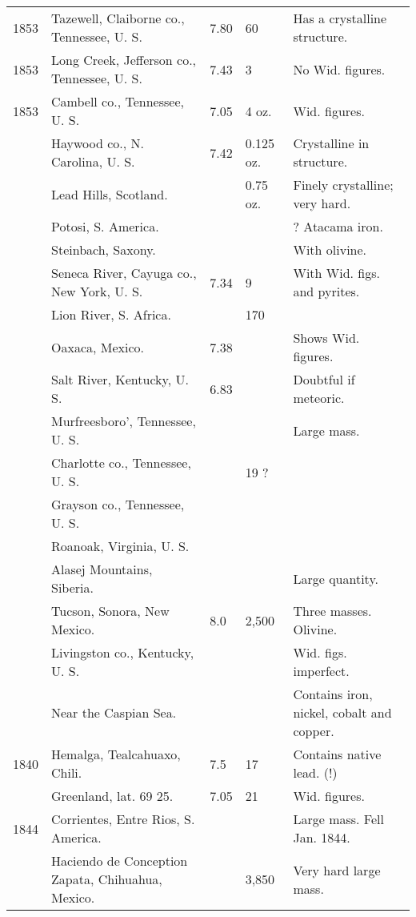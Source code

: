 \documentclass[a4paper, 12pt, oneside]{article}
\begin{document}
\begin{center}
\begin{longtable}{|p{16mm}|p{34mm}|p{10mm}|p{12mm}|p{40mm}|}
        1853 & Tazewell, Claiborne co., Tennessee, U. S. & 7.80 & 60 & Has a crystalline structure. \\
        1853 & Long Creek, Jefferson co., Tennessee, U. S. & 7.43 & 3 & No Wid. figures. \\
        1853 & Cambell co., Tennessee, U. S. & 7.05 & 4 oz. & Wid. figures. \\
        ~ & Haywood co., N. Carolina, U. S. & 7.42 & 0.125 oz. & Crystalline in structure. \\
        ~ & Lead Hills, Scotland. & ~ & 0.75 oz. & Finely crystalline; very hard. \\
        ~ & Potosi, S. America. & ~ & ~ & ? Atacama iron. \\
        ~ & Steinbach, Saxony. & ~ & ~ & With olivine. \\
        ~ & Seneca River, Cayuga co., New York, U. S. & 7.34 & 9 & With Wid. figs. and pyrites. \\
        ~ & Lion River, S. Africa. & ~ & 170 & ~ \\
        ~ & Oaxaca, Mexico. & 7.38 & ~ & Shows Wid. figures. \\
        ~ & Salt River, Kentucky, U. S. & 6.83 & ~ & Doubtful if meteoric. \\
        ~ & Murfreesboro’, Tennessee, U. S. & ~ & ~ & Large mass. \\
        ~ & Charlotte co., Tennessee, U. S. & ~ & 19 ? & ~ \\
        ~ & Grayson co., Tennessee, U. S. & ~ & ~ & ~ \\
        ~ & Roanoak, Virginia, U. S. & ~ & ~ & ~ \\
        ~ & Alasej Mountains, Siberia. & ~ & ~ & Large quantity. \\
        ~ & Tucson, Sonora, New Mexico. & 8.0 & 2,500 & Three masses. Olivine. \\
        ~ & Livingston co., Kentucky, U. S. & ~ & ~ & Wid. figs. imperfect. \\
        ~ & Near the Caspian Sea. & ~ & ~ & Contains iron, nickel, cobalt and copper. \\
        1840 & Hemalga, Tealcahuaxo, Chili. & 7.5 & 17 & Contains native lead. (!) \\
        ~ & Greenland, lat. 69 25. & 7.05 & 21 & Wid. figures. \\
        1844 & Corrientes, Entre Rios, S. America. & ~ & ~ & Large mass. Fell Jan. 1844. \\
        ~ & Haciendo de Conception Zapata, Chihuahua, Mexico. & ~ & 3,850 & Very hard large mass. \\

\end{longtable}
\end{center}
\end{document}
